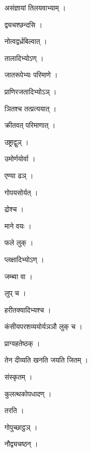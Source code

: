 \documentclass[10pt, openany]{book}
\begin{document}
\noindent असंज्ञायां तिलयवाभ्याम् ।

\noindent द्व्यचश्छन्दसि ।

\noindent नोत्वद्वर्ध्रबिल्वात् ।

\noindent तालादिभ्योऽण् ।

\noindent जातरूपेभ्यः परिमाणे ।

\noindent प्राणिरजतादिभ्योऽञ् ।

\noindent ञितश्च तत्प्रत्ययात् ।

\noindent क्रीतवत् परिमाणात् ।

\noindent उष्ट्राद्वुञ् ।

\noindent उमोर्णयोर्वा ।

\noindent एण्या ढञ् ।

\noindent गोपयसोर्यत् ।

\noindent द्रोश्च ।

\noindent माने वयः ।

\noindent फले लुक् ।

\noindent प्लक्षादिभ्योऽण् ।

\noindent जम्ब्वा वा ।

\noindent लुप् च ।

\noindent हरीतक्यादिभ्यश्च ।

\noindent कंसीयपरशव्ययोर्यञञौ लुक् च ।

\noindent प्राग्वहतेष्ठक् ।

\noindent तेन दीव्यति खनति जयति जितम् ।

\noindent संस्कृतम् ।

\noindent कुलत्थकोपधादण् ।

\noindent तरति ।

\noindent गोपुच्छाट्ठञ् ।

\noindent नौद्व्यचष्ठन् ।
\end{document}
